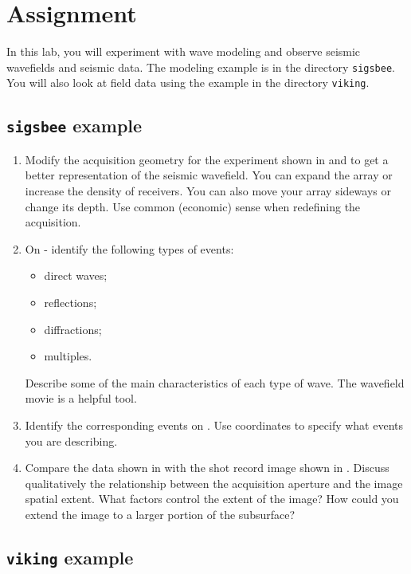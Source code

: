 \section{Assignment}

In this lab, you will experiment with wave modeling and observe
seismic wavefields and seismic data. The modeling example is in the
directory \texttt{sigsbee}. You will also look at field data using the
example in the directory \texttt{viking}.

\subsection{\texttt{sigsbee} example}
\begin{enumerate}
\item Modify the acquisition geometry for the experiment shown in
   and  to get a better representation of the
  seismic wavefield. You can expand the array or increase the density
  of receivers. You can also move your array sideways or change its
  depth. Use common (economic) sense when redefining the acquisition.
\item On - identify the following types of
  events: 
  \begin{itemize}
  \item direct waves;
  \item reflections;
  \item diffractions;
  \item multiples.
  \end{itemize}
  Describe some of the main characteristics of each type of wave. The
  wavefield movie is a helpful tool.
\item Identify the corresponding events on . Use
  coordinates to specify what events you are describing.
\item Compare the data shown in  with the shot record image
  shown in . Discuss qualitatively the relationship between
  the acquisition aperture and the image spatial extent. What factors
  control the extent of the image? How could you extend the image to a
  larger portion of the subsurface? 
\end{enumerate}

\subsection{\texttt{viking} example}

